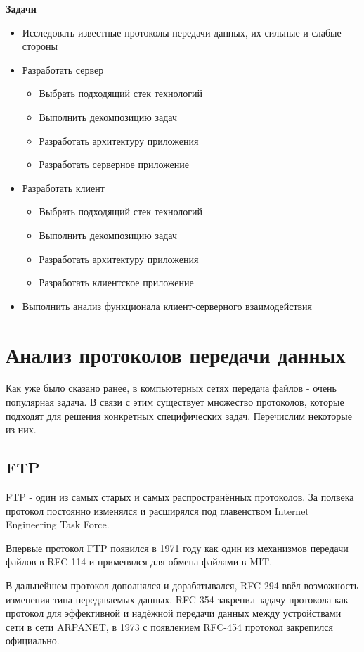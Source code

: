 \documentclass[a4paper,14pt]{extarticle}
\begin{document}
\textbf{Задачи}
\begin{itemize}
  \item Исследовать известные протоколы передачи данных, их сильные и слабые стороны
  \item Разработать сервер
  \begin{itemize}
    \item Выбрать подходящий стек технологий
    \item Выполнить декомпозицию задач
    \item Разработать архитектуру приложения
    \item Разработать серверное приложение
  \end{itemize}
  \item Разработать клиент
  \begin{itemize}
    \item Выбрать подходящий стек технологий
    \item Выполнить декомпозицию задач
    \item Разработать архитектуру приложения
    \item Разработать клиентское приложение
  \end{itemize}
  \item Выполнить анализ функционала клиент-серверного взаимодействия
\end{itemize}

\newpage

\section{Анализ протоколов передачи данных}
Как уже было сказано ранее, в компьютерных сетях передача файлов - очень
популярная задача. В связи с этим существует множество протоколов, которые 
подходят для решения конкретных специфических задач. Перечислим некоторые из них.

\subsection{FTP}
FTP - один из самых старых и самых распространённых протоколов. За полвека 
протокол постоянно изменялся и расширялся под главенством Internet Engineering Task Force.

Впервые протокол FTP появился в 1971 году как один из механизмов передачи
файлов в RFC-114 и применялся для обмена файлами в MIT.

В дальнейшем протокол дополнялся и дорабатывался, RFC-294 ввёл возможность
изменения типа передаваемых данных. RFC-354 закрепил задачу протокола как
протокол для эффективной и надёжной передачи данных между устройствами сети в сети ARPANET, 
в 1973 с появлением RFC-454 протокол закрепился официально.
\end{document}
